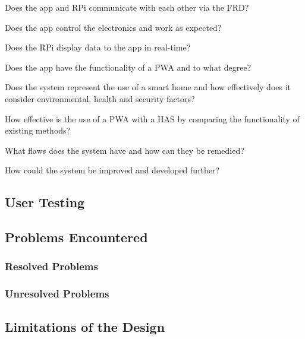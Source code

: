 \documentclass[final]{cmpreport}
\begin{document}
    Does the app and RPi communicate with each other via the FRD?
    
    Does the app control the electronics and work as expected?
    
    Does the RPi display data to the app in real-time?
    
    Does the app have the functionality of a PWA and to what degree?
    
    Does the system represent the use of a smart home and how effectively does it consider environmental, health and security factors?
    
    How effective is the use of a PWA with a HAS by comparing the functionality of existing methods?
    
    What flaws does the system have and how can they be remedied?
    
    How could the system be improved and developed further?
    
    \subsection{User Testing}
    
    \subsection{Problems Encountered}
    
        \subsubsection{Resolved Problems}
        
        \subsubsection{Unresolved Problems}
    
    \subsection{Limitations of the Design}
    
\end{document}
